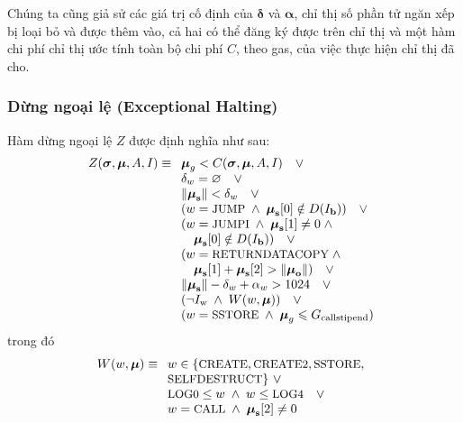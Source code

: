 \documentclass[9pt,oneside]{amsart}
\makeatletter
\newcommand{\linkdest}[1]{\Hy@raisedlink{\hypertarget{#1}{}}}
\makeatother
\begin{document}
\begin{multicols}{2}
Chúng ta cũng giả sử các giá trị cố định của $\mathbf{\delta}$ và $\mathbf{\alpha}$, chỉ thị số phần tử ngăn xếp bị loại bỏ và được thêm vào, cả hai có thể đăng ký được trên chỉ thị và một hàm chi phí chỉ thị ước tính toàn bộ chi phí $C$, theo gas, của việc thực hiện chỉ thị đã cho.

\subsubsection{Dừng ngoại lệ (Exceptional Halting)}\hypertarget{Exceptional_Halting_function_Z}{}\linkdest{zhalt}

Hàm dừng ngoại lệ $Z$ được định nghĩa như sau:
\begin{equation}
Z(\boldsymbol{\sigma}, \boldsymbol{\mu}, A, I) \equiv
\begin{array}[t]{l}
\boldsymbol{\mu}_g < C(\boldsymbol{\sigma}, \boldsymbol{\mu}, A, I) \quad \vee \\
\mathbf{\delta}_w = \varnothing \quad \vee \\
\lVert\boldsymbol{\mu}_\mathbf{s}\rVert < \mathbf{\delta}_w \quad \vee \\
( w = \text{\small JUMP} \; \wedge \; \boldsymbol{\mu}_\mathbf{s}[0] \notin D(I_\mathbf{b}) ) \quad \vee \\
( w = \text{\small JUMPI} \; \wedge \; \boldsymbol{\mu}_\mathbf{s}[1] \neq 0 \; \wedge \\
\quad \boldsymbol{\mu}_\mathbf{s}[0] \notin D(I_\mathbf{b}) ) \quad \vee \\
( w = \text{\small RETURNDATACOPY} \; \wedge \\ \quad \boldsymbol{\mu}_{\mathbf{s}}[1] + \boldsymbol{\mu}_{\mathbf{s}}[2] > \lVert\boldsymbol{\mu}_{\mathbf{o}}\rVert) \quad \vee \\
\lVert\boldsymbol{\mu}_\mathbf{s}\rVert - \mathbf{\delta}_w + \mathbf{\alpha}_w > 1024 \quad \vee \\
( \neg I_{\mathrm{w}} \; \wedge \; W(w, \boldsymbol{\mu}) ) \quad \vee \\
( w = \text{\small SSTORE} \; \wedge \; \boldsymbol{\mu}_g \leqslant G_{\mathrm{callstipend}} )
\end{array}
\end{equation}
trong đó
\begin{equation}
W(w, \boldsymbol{\mu}) \equiv \\
\begin{array}[t]{l}
w \in \{\text{\small CREATE}, \text{\small CREATE2}, \text{\small SSTORE},\\ \text{\small SELFDESTRUCT}\} \ \vee \\
\text{\small LOG0} \le w \; \wedge \; w \le \text{\small LOG4} \quad \vee \\
w = \text{\small CALL} \; \wedge \; \boldsymbol{\mu}_{\mathbf{s}}[2] \neq 0
\end{array}
\end{equation}


\end{multicols}
\end{document}
